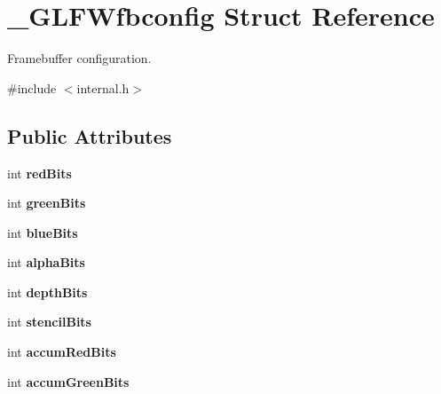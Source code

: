 \hypertarget{struct__GLFWfbconfig}{}\section{\+\_\+\+G\+L\+F\+Wfbconfig Struct Reference}
\label{struct__GLFWfbconfig}


Framebuffer configuration.  




{\ttfamily \#include $<$internal.\+h$>$}

\subsection*{Public Attributes}
\begin{DoxyCompactItemize}
\item 
\hypertarget{struct__GLFWfbconfig_ab9a8f50cbc9b0c6e1ad230e411797f44}{}int {\bfseries red\+Bits}\label{struct__GLFWfbconfig_ab9a8f50cbc9b0c6e1ad230e411797f44}

\item 
\hypertarget{struct__GLFWfbconfig_af19c4a4e81f5e852ebfbfdc5986610ab}{}int {\bfseries green\+Bits}\label{struct__GLFWfbconfig_af19c4a4e81f5e852ebfbfdc5986610ab}

\item 
\hypertarget{struct__GLFWfbconfig_aff797f80ccb99126ce88f696f745f6e5}{}int {\bfseries blue\+Bits}\label{struct__GLFWfbconfig_aff797f80ccb99126ce88f696f745f6e5}

\item 
\hypertarget{struct__GLFWfbconfig_a9945d1191aaa94d92f326382027a43a0}{}int {\bfseries alpha\+Bits}\label{struct__GLFWfbconfig_a9945d1191aaa94d92f326382027a43a0}

\item 
\hypertarget{struct__GLFWfbconfig_a0e7baeca6ea2e4146236f38bc1df870f}{}int {\bfseries depth\+Bits}\label{struct__GLFWfbconfig_a0e7baeca6ea2e4146236f38bc1df870f}

\item 
\hypertarget{struct__GLFWfbconfig_a202a6343c817e5f6e9597a02559273b9}{}int {\bfseries stencil\+Bits}\label{struct__GLFWfbconfig_a202a6343c817e5f6e9597a02559273b9}

\item 
\hypertarget{struct__GLFWfbconfig_a90657631c2de9e7e45ae16b836c6cf4a}{}int {\bfseries accum\+Red\+Bits}\label{struct__GLFWfbconfig_a90657631c2de9e7e45ae16b836c6cf4a}

\item 
\hypertarget{struct__GLFWfbconfig_a5207821bf6a7cf5625bb350b448c1ab9}{}int {\bfseries accum\+Green\+Bits}\label{struct__GLFWfbconfig_a5207821bf6a7cf5625bb350b448c1ab9}


\end{DoxyCompactItemize}
